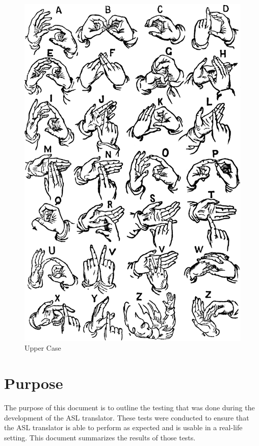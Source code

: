 \documentclass[12pt, titlepage]{article}
\begin{document}
\begin{figure}[H] 
\centering
\includegraphics[width=\textwidth,height=0.95\textheight,keepaspectratio]{upper_cases.PNG} 
\caption{Upper Case} 
\label{Fig.Upper Case} 
\end{figure}

\newpage

\tableofcontents

\listoftables %

\listoffigures %

\newpage


\section{Purpose}
The purpose of this document is to outline the testing that was done during the development 
of the ASL translator. These tests were conducted to ensure that the ASL translator is able 
to perform as expected and is usable in a real-life setting. This document summarizes the 
results of those tests.
\end{document}

